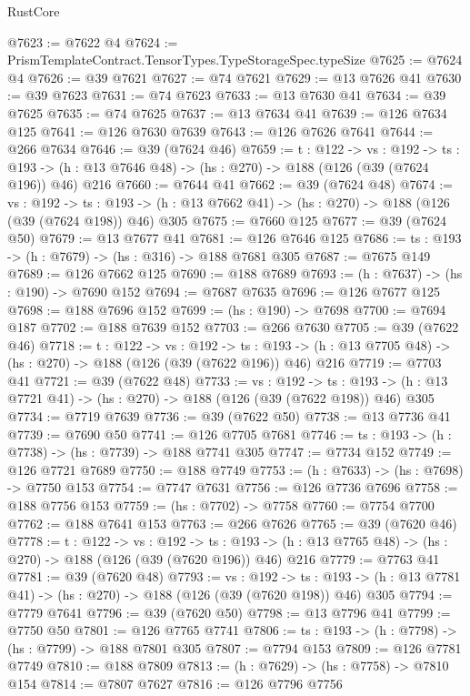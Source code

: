 \begin{lexlean}{RustCore}
\begin{coremodule}
@7623 := @7622 @4
@7624 := PrismTemplateContract.TensorTypes.TypeStorageSpec.typeSize
@7625 := @7624 @4
@7626 := @39 @7621
@7627 := @74 @7621
@7629 := @13 @7626 @41
@7630 := @39 @7623
@7631 := @74 @7623
@7633 := @13 @7630 @41
@7634 := @39 @7625
@7635 := @74 @7625
@7637 := @13 @7634 @41
@7639 := @126 @7634 @125
@7641 := @126 @7630 @7639
@7643 := @126 @7626 @7641
@7644 := @266 @7634
@7646 := @39 (@7624 @46)
@7659 := {t : @122} ->
  {vs : @192} ->
  {ts : @193} -> (h : @13 @7646 @48) -> (hs : @270) -> @188 (@126 (@39 (@7624 @196)) @46) @216
@7660 := @7644 @41
@7662 := @39 (@7624 @48)
@7674 := {vs : @192} ->
  {ts : @193} -> (h : @13 @7662 @41) -> (hs : @270) -> @188 (@126 (@39 (@7624 @198)) @46) @305
@7675 := @7660 @125
@7677 := @39 (@7624 @50)
@7679 := @13 @7677 @41
@7681 := @126 @7646 @125
@7686 := {ts : @193} -> (h : @7679) -> (hs : @316) -> @188 @7681 @305
@7687 := @7675 @149
@7689 := @126 @7662 @125
@7690 := @188 @7689
@7693 := (h : @7637) -> (hs : @190) -> @7690 @152
@7694 := @7687 @7635
@7696 := @126 @7677 @125
@7698 := @188 @7696 @152
@7699 := (hs : @190) -> @7698
@7700 := @7694 @187
@7702 := @188 @7639 @152
@7703 := @266 @7630
@7705 := @39 (@7622 @46)
@7718 := {t : @122} ->
  {vs : @192} ->
  {ts : @193} -> (h : @13 @7705 @48) -> (hs : @270) -> @188 (@126 (@39 (@7622 @196)) @46) @216
@7719 := @7703 @41
@7721 := @39 (@7622 @48)
@7733 := {vs : @192} ->
  {ts : @193} -> (h : @13 @7721 @41) -> (hs : @270) -> @188 (@126 (@39 (@7622 @198)) @46) @305
@7734 := @7719 @7639
@7736 := @39 (@7622 @50)
@7738 := @13 @7736 @41
@7739 := @7690 @50
@7741 := @126 @7705 @7681
@7746 := {ts : @193} -> (h : @7738) -> (hs : @7739) -> @188 @7741 @305
@7747 := @7734 @152
@7749 := @126 @7721 @7689
@7750 := @188 @7749
@7753 := (h : @7633) -> (hs : @7698) -> @7750 @153
@7754 := @7747 @7631
@7756 := @126 @7736 @7696
@7758 := @188 @7756 @153
@7759 := (hs : @7702) -> @7758
@7760 := @7754 @7700
@7762 := @188 @7641 @153
@7763 := @266 @7626
@7765 := @39 (@7620 @46)
@7778 := {t : @122} ->
  {vs : @192} ->
  {ts : @193} -> (h : @13 @7765 @48) -> (hs : @270) -> @188 (@126 (@39 (@7620 @196)) @46) @216
@7779 := @7763 @41
@7781 := @39 (@7620 @48)
@7793 := {vs : @192} ->
  {ts : @193} -> (h : @13 @7781 @41) -> (hs : @270) -> @188 (@126 (@39 (@7620 @198)) @46) @305
@7794 := @7779 @7641
@7796 := @39 (@7620 @50)
@7798 := @13 @7796 @41
@7799 := @7750 @50
@7801 := @126 @7765 @7741
@7806 := {ts : @193} -> (h : @7798) -> (hs : @7799) -> @188 @7801 @305
@7807 := @7794 @153
@7809 := @126 @7781 @7749
@7810 := @188 @7809
@7813 := (h : @7629) -> (hs : @7758) -> @7810 @154
@7814 := @7807 @7627
@7816 := @126 @7796 @7756

\end{coremodule}
\end{lexlean}
